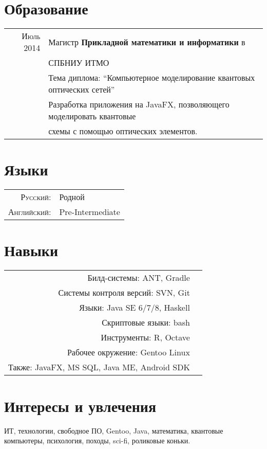 \documentclass[a4paper,10pt]{article}
\begin{document}
\section{Образование}
	\begin{tabular}{rl}	
	  \textsc{Июль 2014} & Магистр \textbf{Прикладной математики и информатики} в \\& \textsc{СПБНИУ ИТМО}\\
			& Тема диплома: ``Компьютерное моделирование квантовых оптических сетей''\\&
			Разработка приложения на JavaFX, позволяющего моделировать квантовые\\& схемы с помощью оптических элементов.
	\end{tabular}

\section{Языки}
	\begin{tabular}{rl}
		\textsc{Русский:}&Родной\\
		\textsc{Английский:}&Pre-Intermediate\\
	\end{tabular}

\section{Навыки}
	\begin{tabular}{rl}
		Билд-системы: ANT, Gradle \\
		Системы контроля версий: SVN, Git \\
		Языки: Java SE 6/7/8, Haskell \\
		Скриптовые языки: bash \\ 
		Инструменты: R, Octave \\
		Рабочее окружение: Gentoo Linux \\
		Также: JavaFX, MS SQL, Java ME, Android SDK
	\end{tabular}

\section{Интересы и увлечения}
	ИТ, технологии, свободное ПО, Gentoo, Java, математика, квантовые компьютеры,
	психология, походы, sci-fi, роликовые коньки. 
\end{document}

